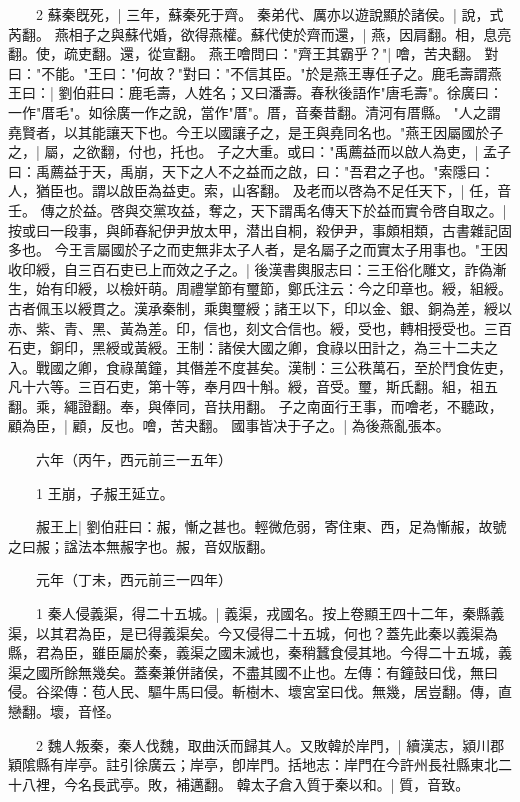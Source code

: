 　　2 蘇秦旣死，|{
	三年，蘇秦死于齊。
	}
秦弟代、厲亦以遊說顯於諸侯。|{
	說，式芮翻。
	}
燕相子之與蘇代婚，欲得燕權。蘇代使於齊而還，|{
	燕，因肩翻。相，息亮翻。使，疏吏翻。還，從宣翻。
	}
燕王噲問曰："齊王其霸乎？"|{
	噲，苦夬翻。
	}
對曰："不能。"王曰："何故？"對曰："不信其臣。"於是燕王專任子之。鹿毛壽謂燕王曰：|{
	劉伯莊曰：鹿毛壽，人姓名；又曰潘壽。春秋後語作"唐毛壽"。徐廣曰：一作"厝毛"。如徐廣一作之說，當作"厝"。厝，音秦昔翻。清河有厝縣。
	}
"人之謂堯賢者，以其能讓天下也。今王以國讓子之，是王與堯同名也。"燕王因屬國於子之，|{
	屬，之欲翻，付也，托也。
	}
子之大重。或曰："禹薦益而以啟人為吏，|{
	孟子曰：禹薦益于天，禹崩，天下之人不之益而之啟，曰："吾君之子也。"索隱曰：人，猶臣也。謂以啟臣為益吏。索，山客翻。
	}
及老而以啓為不足任天下，|{
	任，音壬。
	}
傳之於益。啓與交黨攻益，奪之，天下謂禹名傳天下於益而實令啓自取之。|{
	按或曰一段事，與師春紀伊尹放太甲，潜出自桐，殺伊尹，事頗相類，古書雜記固多也。
	}
今王言屬國於子之而吏無非太子人者，是名屬子之而實太子用事也。"王因收印綬，自三百石吏已上而效之子之。|{
	後漢書輿服志曰：三王俗化雕文，詐偽漸生，始有印綬，以檢奸萌。周禮掌節有璽節，鄭氏注云：今之印章也。綬，組綬。古者佩玉以綬貫之。漢承秦制，乘輿璽綬；諸王以下，印以金、銀、銅為差，綬以赤、紫、青、黑、黃為差。印，信也，刻文合信也。綬，受也，轉相授受也。三百石吏，銅印，黑綬或黃綬。王制：諸侯大國之卿，食祿以田計之，為三十二夫之入。戰國之卿，食祿萬鐘，其僭差不度甚矣。漢制：三公秩萬石，至於鬥食佐吏，凡十六等。三百石吏，第十等，奉月四十斛。綬，音受。璽，斯氏翻。組，祖五翻。乘，繩證翻。奉，與俸同，音扶用翻。
	}
子之南面行王事，而噲老，不聽政，顧為臣，|{
	顧，反也。噲，苦夬翻。
	}
國事皆决于子之。|{
	為後燕亂張本。
	}

　　六年（丙午，西元前三一五年）

　　1 王崩，子赧王延立。

　　赧王上|{
	劉伯莊曰：赧，慚之甚也。輕微危弱，寄住東、西，足為慚赧，故號之曰赧；諡法本無赧字也。赧，音奴版翻。
	}

　　元年（丁未，西元前三一四年）

　　1 秦人侵義渠，得二十五城。|{
	義渠，戎國名。按上卷顯王四十二年，秦縣義渠，以其君為臣，是已得義渠矣。今又侵得二十五城，何也？蓋先此秦以義渠為縣，君為臣，雖臣屬於秦，義渠之國未滅也，秦稍蠶食侵其地。今得二十五城，義渠之國所餘無幾矣。蓋秦兼併諸侯，不盡其國不止也。左傳：有鐘鼓曰伐，無曰侵。谷梁傳：苞人民、驅牛馬曰侵。斬樹木、壞宮室曰伐。無幾，居豈翻。傳，直戀翻。壞，音怪。
	}

　　2 魏人叛秦，秦人伐魏，取曲沃而歸其人。又敗韓於岸門，|{
	續漢志，潁川郡穎隂縣有岸亭。註引徐廣云；岸亭，卽岸門。括地志：岸門在今許州長社縣東北二十八裡，今名長武亭。敗，補邁翻。
	}
韓太子倉入質于秦以和。|{
	質，音致。
	}

